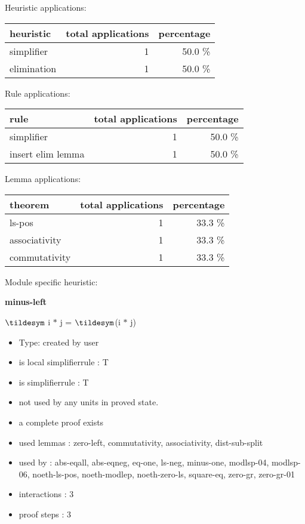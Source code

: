 \documentclass[a4paper]{article}
\begin{document}
\medskip


Heuristic applications:

\begin{supertabular}{l|r|r}
heuristic	& total applications & percentage \\ \hline
simplifier & 1 & 50.0 \% \\
elimination & 1 & 50.0 \% \\

\end{supertabular}

Rule applications:

\begin{supertabular}{l|r|r}
rule	        & total applications & percentage \\ \hline
simplifier & 1 & 50.0 \% \\
insert elim lemma & 1 & 50.0 \% \\

\end{supertabular}

Lemma applications:

\begin{supertabular}{l|r|r}
theorem	        & total applications & percentage \\ \hline
ls-pos & 1 & 33.3 \% \\
associativity & 1 & 33.3 \% \\
commutativity & 1 & 33.3 \% \\

\end{supertabular}

Module specific heuristic:

\pagebreak

{\LARGE\bf minus-left}\label{lemma-minus-left}

\medskip

 \Fol $\tildesym$ i $*$ j = $\tildesym$(i $*$ j)

\begin{itemize}

\item Type: created by user

\item is local simplifierrule : T
\item is simplifierrule : T
\item not used by any units in proved state.
\item       a complete proof exists
\item       used lemmas  : zero-left, commutativity, associativity, dist-sub-split
\item       used by      : abs-eqall, abs-eqneg, eq-one, ls-neg, minus-one, modlsp-04, modlsp-06, noeth-ls-pos, noeth-modlep, noeth-zero-ls, square-eq, zero-gr, zero-gr-01
\item       interactions : 3
\item       proof steps  : 3
\end{itemize}
\end{document}
